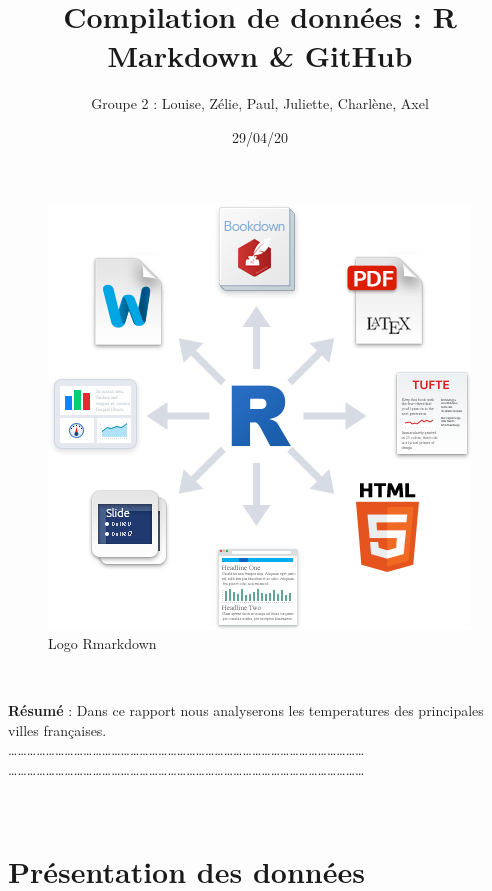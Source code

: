 \documentclass[
]{article}
\title{Compilation de données : R Markdown \& GitHub}
\author{Groupe 2 : Louise, Zélie, Paul, Juliette, Charlène, Axel}
\date{29/04/20}
\begin{document}
\maketitle

{
\setcounter{tocdepth}{3}
\tableofcontents
}
\begin{figure}[h]

{\centering \includegraphics[width=0.8\linewidth]{rmarkdown} 

}

\caption{Logo Rmarkdown}\label{fig:logo}
\end{figure}

~

\textbf{Résumé} : Dans ce rapport nous analyserons les temperatures des
principales villes françaises.\\
\ldots\ldots\ldots\ldots\ldots\ldots\ldots\ldots\ldots\ldots\ldots\ldots\ldots\ldots\ldots\ldots\ldots\ldots\ldots\ldots\ldots\ldots\ldots\ldots\ldots\ldots\ldots\ldots\ldots\ldots\ldots\ldots\ldots\ldots\ldots\ldots\ldots\ldots{}
\ldots\ldots\ldots\ldots\ldots\ldots\ldots\ldots\ldots\ldots\ldots\ldots\ldots\ldots\ldots\ldots\ldots\ldots\ldots\ldots\ldots\ldots\ldots\ldots\ldots\ldots\ldots\ldots\ldots\ldots\ldots\ldots\ldots\ldots\ldots\ldots\ldots\ldots{}

~

\hypertarget{pruxe9sentation-des-donnuxe9es}{%
\section{\texorpdfstring{\textbf{Présentation des données
}}{Présentation des données }}\label{pruxe9sentation-des-donnuxe9es}}
\end{document}
